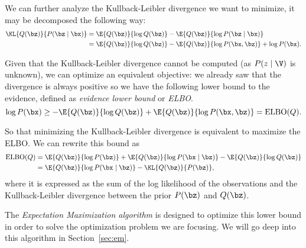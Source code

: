 We can further analyze the Kullback-Leibler divergence we want to minimize, it may be decomposed the following way:
\[
  \begin{aligned}
    \KL{Q(\bz)}{P(\bz \mid \bx)} &= \E{Q(\bz)}{\log{Q(\bz)}} - \E{Q(\bz)}{\log{P(\bz \mid \bx)}}\\
    &= \E{Q(\bz)}{\log{Q(\bz)}} - \E{Q(\bz)}{\log{P(\bx, \bz)}} + \log{P(\bx)}.
  \end{aligned}
\]

Given that the Kullback-Leibler divergence cannot be computed (as \(P(z \mid \V)\) is unknown), we can optimize an equivalent objective: we already saw that the divergence is always positive so we have the following lower bound to the evidence, defined as \emph{evidence lower bound} or \emph{ELBO}.
\[
  \log{P(\bx)} \geq  - \E{Q(\bz)}{\log{Q(\bz)}} + \E{Q(\bz)}{\log{P(\bx, \bz)}}  = \text{ELBO}(Q).
\]

So that minimizing the Kullback-Leibler divergence is equivalent to maximize the ELBO. We can rewrite this bound as
\[
  \begin{aligned}
    \text{ELBO}(Q) &= \E{Q(\bz)}{\log{P(\bz)}} + \E{Q(\bz)}{\log{P(\bx \mid \bz)}} - \E{Q(\bz)}{\log{Q(\bz)}}\\
    &= \E{Q(\bz)}{\log{P(\bx \mid \bz)}} - \KL{Q(\bz)}{P(\bz)},
  \end{aligned}
\]
where it is expressed as the sum of the log likelihood of the observations and the Kullback-Leibler divergence between the prior \(P(\bz)\) and \(Q(\bz)\).

The \emph{Expectation Maximization algorithm} is designed to optimize this lower bound in order to solve the optimization problem we are focusing. We will go deep into this algorithm in Section~\ref{sec:em}.
